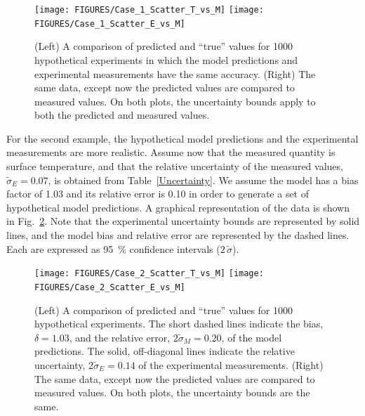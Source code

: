 \begin{figure}[t]
\begin{center}
\texttt{[image: FIGURES/Case\_1\_Scatter\_T\_vs\_M]}
\texttt{[image: FIGURES/Case\_1\_Scatter\_E\_vs\_M]}
\end{center}
\caption[Verification of the model uncertainty calculation, Case 1.]{(Left) A comparison of predicted and ``true'' values for 1000 hypothetical
experiments in which the model predictions and experimental measurements have the same accuracy.
(Right) The same data, except now the predicted values are compared to measured values. On both plots, the uncertainty bounds apply to both
the predicted and measured values.}
\label{Case_1_Scatter}
\end{figure}


For the second example, the hypothetical model predictions and the experimental measurements are more realistic. Assume now that the
measured quantity is surface temperature, and that the relative uncertainty of the measured values, $\widetilde{\sigma}_E=0.07$, is obtained from Table~\ref{Uncertainty}.
We assume the model has a bias factor of 1.03 and its relative error is 0.10 in order to generate a set of hypothetical model predictions.
A graphical representation of the data is shown in Fig.~\ref{Case_2_Scatter}. Note that the
experimental uncertainty bounds are represented by solid lines, and the model bias and relative error are represented by the dashed lines.
Each are expressed as 95~\% confidence intervals ($2 \, \widetilde{\sigma}$).

\begin{figure}[t]
\begin{center}
\texttt{[image: FIGURES/Case\_2\_Scatter\_T\_vs\_M]}
\texttt{[image: FIGURES/Case\_2\_Scatter\_E\_vs\_M]}
\end{center}
\caption[Verification of the model uncertainty calculation, Case 2.]{(Left) A comparison of predicted and ``true'' values for 1000 hypothetical
experiments. The short dashed lines indicate the bias, $\delta=1.03$, and the relative error, $2\widetilde{\sigma}_M=0.20$, of the model predictions.
The solid, off-diagonal lines indicate the relative uncertainty, $2\widetilde{\sigma}_E=0.14$ of the experimental measurements.
(Right) The same data, except now the predicted values are compared to measured values. On both plots, the uncertainty bounds are the same.}
\label{Case_2_Scatter}
\end{figure}

